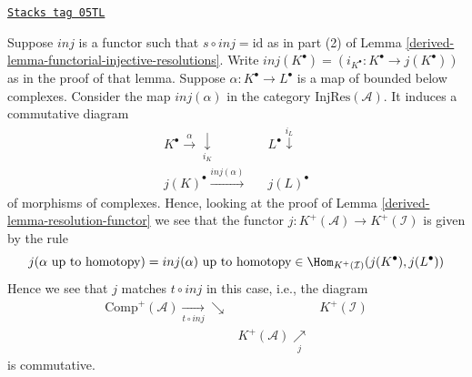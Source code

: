 \begin{remark}[Match]
\label{derived-remark-match}
\href{https://stacks.math.columbia.edu/tag/05TL}{\texttt{Stacks tag 05TL}}

Suppose $inj$ is a functor such that $s \circ inj = \text{id}$
as in part (2) of
Lemma \ref{derived-lemma-functorial-injective-resolutions}.
Write $inj(K^\bullet) = (i_{K^\bullet} : K^\bullet \to j(K^\bullet))$
as in the proof of that lemma.
Suppose $\alpha : K^\bullet \to L^\bullet$ is a map
of bounded below complexes. Consider the map
$inj(\alpha)$ in the category $\text{InjRes}(\mathcal{A})$.
It induces a commutative diagram
$$
\begin{array}{ccc}K^\bullet
\overset{\alpha}{\longrightarrow}\underset{i_K}{\downarrow} &  & L^\bullet \overset{i_L}{\downarrow} \\ j(K)^\bullet
\overset{inj(\alpha)}{\longrightarrow} &  & j(L)^\bullet\end{array}
$$
of morphisms of complexes.
Hence, looking at the proof of
Lemma \ref{derived-lemma-resolution-functor}
we see that the functor $j : K^{+}(\mathcal{A}) \to K^{+}(\mathcal{I})$
is given by the rule
$$
j(\alpha\text{ up to homotopy}) = inj(\alpha)\text{ up to homotopy}\in
\Hom_{K^{+}(\mathcal{I})}(j(K^\bullet), j(L^\bullet))
$$
Hence we see that $j$ matches $t \circ inj$ in this case, i.e., the
diagram
$$
\begin{array}{ccc}\text{Comp}^{+}(\mathcal{A}) \underset{t \circ inj}{\longrightarrow}\searrow &  & K^{+}(\mathcal{I}) \\  & K^{+}(\mathcal{A}) \underset{j}{\nearrow} & \end{array}
$$
is commutative.
\end{remark}

